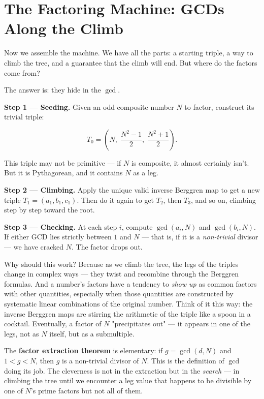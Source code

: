 \documentclass[11pt,openright,twoside]{book}
\theoremstyle{definition}
\begin{document}
\bigskip


\section{The Factoring Machine: GCDs Along the Climb}

Now we assemble the machine. We have all the parts: a starting triple, a way to climb the tree, and a guarantee that the climb will end. But where do the factors come from?

The answer is: they hide in the $\gcd$.

\textbf{Step 1 --- Seeding.} Given an odd composite number $N$ to factor, construct its trivial triple:

\[T_0 = \left(N,\;\frac{N^2 - 1}{2},\;\frac{N^2 + 1}{2}\right).\]

This triple may not be primitive --- if $N$ is composite, it almost certainly isn't. But it is Pythagorean, and it contains $N$ as a leg.

\textbf{Step 2 --- Climbing.} Apply the unique valid inverse Berggren map to get a new triple $T_1 = (a_1, b_1, c_1)$. Then do it again to get $T_2$, then $T_3$, and so on, climbing step by step toward the root.

\textbf{Step 3 --- Checking.} At each step $i$, compute $\gcd(a_i, N)$ and $\gcd(b_i, N)$. If either GCD lies strictly between $1$ and $N$ --- that is, if it is a \textit{non-trivial} divisor --- we have cracked $N$. The factor drops out.

Why should this work? Because as we climb the tree, the legs of the triples change in complex ways --- they twist and recombine through the Berggren formulas. And a number's factors have a tendency to \textit{show up} as common factors with other quantities, especially when those quantities are constructed by systematic linear combinations of the original number. Think of it this way: the inverse Berggren maps are stirring the arithmetic of the triple like a spoon in a cocktail. Eventually, a factor of $N$ "precipitates out" --- it appears in one of the legs, not as $N$ itself, but as a submultiple.

The \textbf{factor extraction theorem} is elementary: if $g = \gcd(d, N)$ and $1 < g < N$, then $g$ is a non-trivial divisor of $N$. This is the definition of $\gcd$ doing its job. The cleverness is not in the extraction but in the \textit{search} --- in climbing the tree until we encounter a leg value that happens to be divisible by one of $N$'s prime factors but not all of them.
\end{document}
